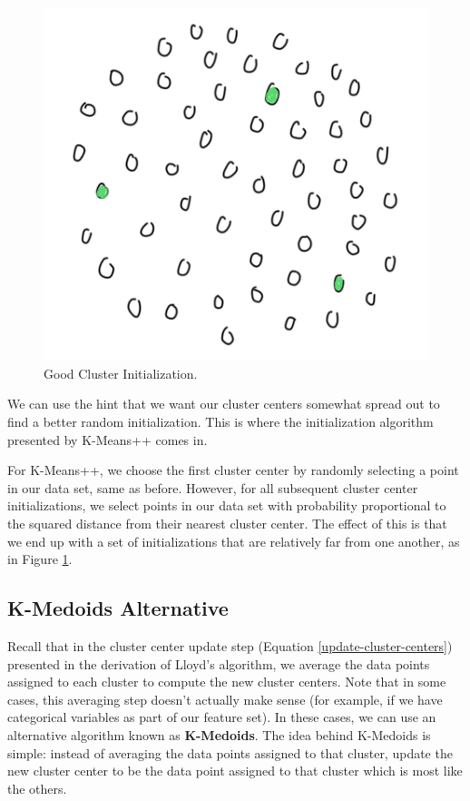 \begin{figure}
    \centering
    \includegraphics[width=0.5\paperwidth]{../Clustering/fig/good-initialization.png}
    \caption{Good Cluster Initialization.}
    \label{fig:good-init}
\end{figure}

We can use the hint that we want our cluster centers somewhat spread out to find a better random initialization. This is where the initialization algorithm presented by K-Means++ comes in.

For K-Means++, we choose the first cluster center by randomly selecting a point in our data set, same as before. However, for all subsequent cluster center initializations, we select points in our data set with probability proportional to the squared distance from their nearest cluster center. The effect of this is that we end up with a set of initializations that are relatively far from one another, as in Figure \ref{fig:good-init}.

\subsection{K-Medoids Alternative}
Recall that in the cluster center update step (Equation \ref{update-cluster-centers}) presented in the derivation of Lloyd's algorithm, we average the data points assigned to each cluster to compute the new cluster centers. Note that in some cases, this averaging step doesn't actually make sense (for example, if we have categorical variables as part of our feature set). In these cases, we can use an alternative algorithm known as \textbf{K-Medoids}. The idea behind K-Medoids is simple: instead of averaging the data points assigned to that cluster, update the new cluster center to be the data point assigned to that cluster which is most like the others.

